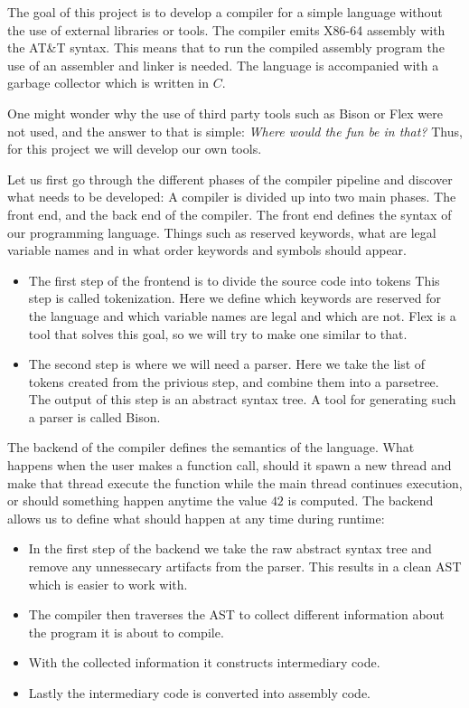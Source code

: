 The goal of this project is to develop a compiler for a simple language without the use of external libraries or tools. The compiler emits X86-64 assembly with the AT\&T syntax. This means that to run the compiled assembly program the use of an assembler and linker is needed. The language is accompanied with a garbage collector which is written in $C$. 

One might wonder why the use of third party tools such as Bison or Flex were not used, and the answer to that is simple: \textit{Where would the fun be in that?} Thus, for this project we will develop our own tools. 

Let us first go through the different phases of the compiler pipeline and discover what needs to be developed:
A compiler is divided up into two main phases. The front end, and the back end of the compiler. The front end defines the syntax of our programming language. Things such as reserved keywords, what are legal variable names and in what order keywords and symbols should appear. 
\begin{itemize}
    \item The first step of the frontend is to divide the source code into tokens This step is called tokenization. Here we define which keywords are reserved for the language and which variable names are legal and which are not. Flex is a tool that solves this goal, so we will try to make one similar to that.
    \item The second step is where we will need a parser. Here we take the list of tokens created from the privious step, and combine them into a parsetree. The output of this step is an abstract syntax tree. A tool for generating such a parser is called Bison.
\end{itemize}  

The backend of the compiler defines the semantics of the language. What happens when the user makes a function call, should it spawn a new thread and make that thread execute the function while the main thread continues execution, or should something happen anytime the value $42$ is computed. The backend allows us to define what should happen at any time during runtime:
\begin{itemize}
  \item In the first step of the backend we take the raw abstract syntax tree and remove any unnessecary artifacts from the parser. This results in a clean AST which is easier to work with.
  \item The compiler then traverses the AST to collect different information about the program it is about to compile.
  \item With the collected information it constructs intermediary code.
  \item Lastly the intermediary code is converted into assembly code.
\end{itemize}

